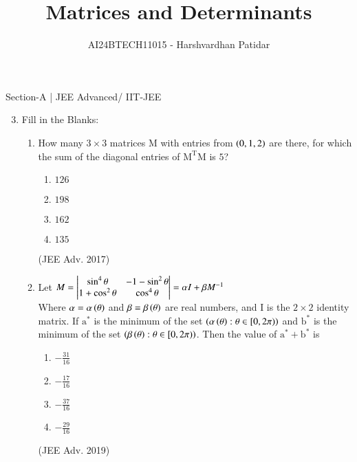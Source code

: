 \documentclass[journal,12pt,twocolumn]{IEEEtran}
\theoremstyle{remark}
\begin{document}

\vspace{3cm}

\title{Matrices and Determinants}
\author{AI24BTECH11015 - Harshvardhan Patidar}
\maketitle
\newpage
\bigskip

\renewcommand{\thefigure}{\theenumi}
\renewcommand{\thetable}{\theenumi}



Section-A | JEE Advanced/ IIT-JEE
 
\begin{enumerate} \setcounter{enumi}{2}
	\item
		Fill in the Blanks:
			\begin{enumerate} 
				\item
					How many $3 \times 3$ matrices M with entries from $\left(0,1,2\right)$ are there, for which the sum of the diagonal entries of $\mathrm{M^TM}$ is $5$?
						\begin{enumerate}
							\item $126$
							\item $198$
							\item $162$
							\item $135$
						\end{enumerate}
						\hfill (JEE Adv. 2017)\\
				\item
					Let $M= \begin{vmatrix}
						\sin^4 \theta & -1 -\sin^2 \theta\\
						1+\cos^2 \theta & \cos^4 \theta
						\end{vmatrix} = 
						\alpha I + \beta M^{-1}$\\
					Where $\alpha = \alpha \left(\theta\right)$ and $\beta = \beta \left(\theta\right)$ are real numbers, and I is the $2 \times 2$ identity matrix. If $\mathrm{a^*}$ is the minimum of the set $\left(\alpha \left(\theta\right) : \theta \in [0, 2 \pi)\right)$ and $\mathrm{b^*}$ is the minimum of the set $\left(\beta \left(\theta\right) : \theta \in [0, 2 \pi)\right)$. Then the value of $\mathrm{a^*} + \mathrm{b^*}$ is
						\begin{enumerate}
							\item $-\frac{31}{16}$
							\item $-\frac{17}{16}$
							\item $-\frac{37}{16}$
							\item $-\frac{29}{16}$
						\end{enumerate}
						\hfill (JEE Adv. 2019)\\
			\end{enumerate}


\end{enumerate}
\end{document}

